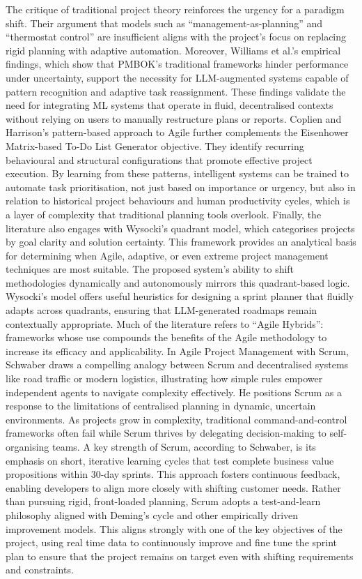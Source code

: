 \documentclass{report}
\begin{document}
The critique of traditional project theory reinforces the urgency for a paradigm shift. Their argument that models such as “management-as-planning” and “thermostat control” are insufficient aligns with the project's focus on replacing rigid planning with adaptive automation. Moreover, Williams et al.’s empirical findings, which show that PMBOK’s traditional frameworks hinder performance under uncertainty, support the necessity for LLM-augmented systems capable of pattern recognition and adaptive task reassignment. These findings validate the need for integrating ML systems that operate in fluid, decentralised contexts without relying on users to manually restructure plans or reports.
Coplien and Harrison’s pattern-based approach to Agile further complements the Eisenhower Matrix-based To-Do List Generator objective. They identify recurring behavioural and structural configurations that promote effective project execution. By learning from these patterns, intelligent systems can be trained to automate task prioritisation, not just based on importance or urgency, but also in relation to historical project behaviours and human productivity cycles, which is a layer of complexity that traditional planning tools overlook.
Finally, the literature also engages with Wysocki’s quadrant model, which categorises projects by goal clarity and solution certainty. This framework provides an analytical basis for determining when Agile, adaptive, or even extreme project management techniques are most suitable. The proposed system's ability to shift methodologies dynamically and autonomously mirrors this quadrant-based logic. Wysocki’s model offers useful heuristics for designing a sprint planner that fluidly adapts across quadrants, ensuring that LLM-generated roadmaps remain contextually appropriate.
Much of the literature refers to “Agile Hybrids”: frameworks whose use compounds the benefits of the Agile methodology to increase its efficacy and applicability. In Agile Project Management with Scrum, Schwaber \parencite{schwaberAgileProjectManagement2004} draws a compelling analogy between Scrum and decentralised systems like road traffic or modern logistics, illustrating how simple rules empower independent agents to navigate complexity effectively. He positions Scrum as a response to the limitations of centralised planning in dynamic, uncertain environments. As projects grow in complexity, traditional command-and-control frameworks often fail while Scrum thrives by delegating decision-making to self-organising teams.
A key strength of Scrum, according to Schwaber, is its emphasis on short, iterative learning cycles that test complete business value propositions within 30-day sprints. This approach fosters continuous feedback, enabling developers to align more closely with shifting customer needs. Rather than pursuing rigid, front-loaded planning, Scrum adopts a test-and-learn philosophy aligned with Deming's cycle and other empirically driven improvement models. This aligns strongly with one of the key objectives of the project, using real time data to continuously improve and fine tune the sprint plan to ensure that the project remains on target even with shifting requirements and constraints.
\end{document}
